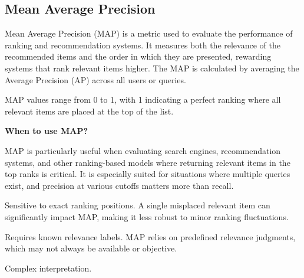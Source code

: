 \subsection{Mean Average Precision}

Mean Average Precision (MAP) is a metric used to evaluate the performance of ranking and recommendation systems. It measures
both the relevance of the recommended items and the order in which they are presented, rewarding systems that rank relevant
items higher. The MAP is calculated by averaging the Average Precision (AP) across all users or queries. 

\begin{center}
\end{center}

MAP values range from 0 to 1, with 1 indicating a perfect ranking where all relevant items are placed at the top of the list.

\textbf{When to use MAP?}

MAP is particularly useful when evaluating search engines, recommendation systems, and other ranking-based models where
returning relevant items in the top ranks is critical. It is especially suited for situations where multiple queries exist,
and precision at various cutoffs matters more than recall.

{
    \item Sensitive to exact ranking positions. A single misplaced relevant item can significantly impact MAP, making it less
    robust to minor ranking fluctuations.
    \item Requires known relevance labels. MAP relies on predefined relevance judgments, which may not always be
    available or objective.
    \item Complex interpretation.

}

